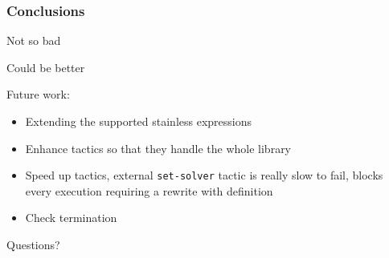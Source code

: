 \documentclass{beamer}
\newcommand{\coqInline}[1]{\lstinline[style=myCoqStyle]|#1|}
\begin{document}
\begin{frame}
	\frametitle{Conclusions}
	Not so bad
	
	 {Could be better}
	
	 {
		Future work: 
		\begin{itemize}
			\item Extending the supported stainless expressions
			\item Enhance tactics so that they handle the whole library
			\item Speed up tactics, external \coqInline{set-solver} tactic is really slow to fail, blocks every execution requiring a rewrite with definition
			\item Check termination
		\end{itemize}
		
	}
\end{frame}



\begin{frame}
	\Huge{\centerline{Questions?}}
\end{frame}
\end{document}
